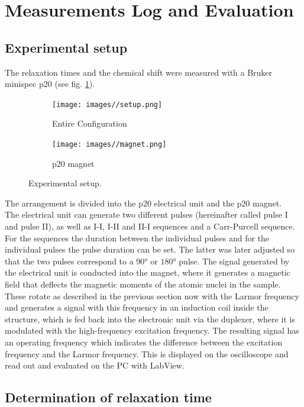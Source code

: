 \section{Measurements Log and Evaluation}


\subsection{Experimental setup}
The relaxation times and the chemical shift were measured with a Bruker minispec p20 (see fig. \ref{fig:setup}).
\begin{figure}[ht]
\centering
\begin{subfigure}{.45\textwidth}
\centering
\texttt{[image: images//setup.png]}
\caption{Entire Configuration}
\end{subfigure}
\quad
\begin{subfigure}{.45\textwidth}
\centering
\texttt{[image: images//magnet.png]}
\caption{p20 magnet}
\end{subfigure}
\caption{Experimental setup.}
\label{fig:setup}
\end{figure}
The arrangement is divided into the p20 electrical unit and the p20 magnet.\\
The electrical unit can generate two different pulses (hereinafter called pulse I and pulse II), as well as I-I, I-II and II-I sequences and a Carr-Purcell sequence.
For the sequences the duration between the individual pulses and for the individual pulses the pulse duration can be set.
The latter was later adjusted so that the two pulses correspond to a $\ang{90}$ or $\ang{180}$ pulse.
The signal generated by the electrical unit is conducted into the magnet, where it generates a magnetic field that deflects the magnetic moments of the atomic nuclei in the sample.
These rotate as described in the previous section now with the Larmor frequency and generates a signal with this frequency in an induction coil inside the structure, which is fed back into the electronic unit via the duplexer, where it is modulated with the high-frequency excitation frequency.
The resulting signal has an operating frequency which indicates the difference between the excitation frequency and the Larmor frequency.
This is displayed on the oscilloscope and read out and evaluated on the PC with LabView.


\subsection{Determination of relaxation time}


